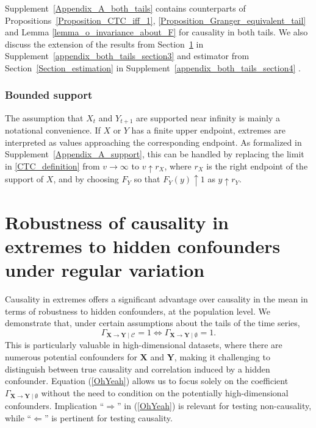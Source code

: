 \documentclass[a4paper,11pt]{article}
\begin{document}
Supplement~\ref{Appendix_A_both_tails} contains counterparts of Propositions~\ref{Proposition_CTC_iff_1}, \ref{Proposition_Granger_equivalent_tail} and Lemma \ref{lemma_o_invariance_about_F} for causality in both tails. We also discuss the extension of the results from Section~\ref{section3} in Supplement~\ref{appendix_both_tails_section3} and estimator from Section~\ref{Section_estimation} in Supplement~\ref{appendix_both_tails_section4}  . 

\subsubsection{Bounded support}
The assumption that \(X_t\) and \(Y_{t+1}\) are supported near infinity is mainly a notational convenience. If \(X\) or \(Y\) has a finite upper endpoint, extremes are interpreted as values approaching the corresponding endpoint. As formalized in Supplement~\ref{Appendix_A_support}, this can be handled by replacing the limit in \eqref{CTC_definition} from \(v\to\infty\) to \(v\uparrow r_X\), where \(r_X\) is the right endpoint of the support of \(X\), and by choosing \(F_Y\) so that \(F_Y(y)\uparrow1\) as \(y\uparrow r_Y\).

\section{Robustness of causality in extremes to hidden confounders under regular variation}
\label{section3}
Causality in extremes offers a significant advantage over causality in the mean in terms of robustness to hidden confounders, at the population level. We demonstrate that, under certain assumptions about the tails of the time series,
\begin{equation}\label{OhYeah}%
\Gamma_{\textbf{X}\to\textbf{Y}\mid\mathcal{C}} = 1 \iff  \Gamma_{\textbf{X}\to\textbf{Y}\mid \emptyset} = 1.
\end{equation}
This is particularly valuable in high-dimensional datasets, where there are numerous potential confounders for $\textbf{X}$ and $\textbf{Y}$, making it challenging to distinguish between true causality and correlation induced by a hidden confounder. Equation (\ref{OhYeah}) allows us to focus solely on the coefficient $\Gamma_{\textbf{X}\to\textbf{Y}\mid \emptyset}$ without the need to condition on the potentially high-dimensional confounders. Implication ``$\Longrightarrow$'' in (\ref{OhYeah}) is relevant for testing non-causality, while ``$\Longleftarrow$'' is pertinent for testing causality.
\end{document}
